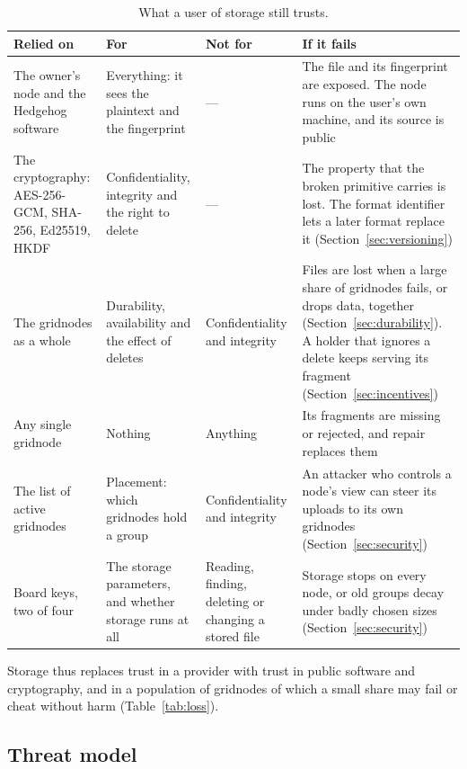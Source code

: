 \documentclass[10pt,a4paper,final]{article}
\begin{document}
\begin{table}[H]
\centering
\small
\begin{tabularx}{\linewidth}{@{}>{\raggedright\arraybackslash}p{2.7cm}>{\hsize}L>{\hsize}L
	>{\hsize}L@{}}
\toprule
Relied on & For & Not for & If it fails \\
\midrule
The owner's node and the Hedgehog software & Everything: it sees the plaintext and the fingerprint & --- & The file
and its fingerprint are exposed. The node runs on the user's own machine, and its source is public \\
\addlinespace
The cryptography: AES-256-GCM, SHA-256, Ed25519, HKDF & Confidentiality, integrity and the right to delete & --- &
The property that the broken primitive carries is lost. The format identifier lets a later format replace it
(Section~\ref{sec:versioning}) \\
\addlinespace
The gridnodes as a whole & Durability, availability and the effect of deletes & Confidentiality and integrity & Files
are lost when a large share of gridnodes fails, or drops data, together (Section~\ref{sec:durability}). A holder that
ignores a delete keeps serving its fragment (Section~\ref{sec:incentives}) \\
\addlinespace
Any single gridnode & Nothing & Anything & Its fragments are missing or rejected, and repair replaces them \\
\addlinespace
The list of active gridnodes & Placement: which gridnodes hold a group & Confidentiality and integrity & An attacker
who controls a node's view can steer its uploads to its own gridnodes (Section~\ref{sec:security}) \\
\addlinespace
Board keys, two of four & The storage parameters, and whether storage runs at all & Reading, finding, deleting
or changing a stored file & Storage stops on every node, or old groups decay under badly chosen sizes
(Section~\ref{sec:security}) \\
\bottomrule
\end{tabularx}
\caption{What a user of storage still trusts.}
\label{tab:trust}
\end{table}

Storage thus replaces trust in a provider with trust in public software and cryptography, and in a population of
gridnodes of which a small share may fail or cheat without harm (Table~\ref{tab:loss}).

\subsection{Threat model}
\end{document}
